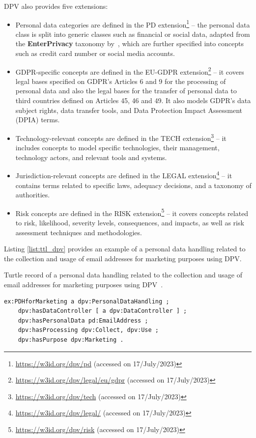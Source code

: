 DPV also provides five extensions:
\begin{itemize}
    \item Personal data categories are defined in the PD extension\footnote{\url{https://w3id.org/dpv/pd} (accessed on 17/July/2023)} -- the personal data class is split into generic classes such as financial or social data, adapted from the \textbf{EnterPrivacy} taxonomy by~\cite{cronk_categories_2017}, which are further specified into concepts such as credit card number or social media accounts.
    \item GDPR-specific concepts are defined in the EU-GDPR extension\footnote{\url{https://w3id.org/dpv/legal/eu/gdpr} (accessed on 17/July/2023)} -- it covers legal bases specified on GDPR's Articles 6 and 9 for the processing of personal data and also the legal bases for the transfer of personal data to third countries defined on Articles 45, 46 and 49. It also models GDPR's data subject rights, data transfer tools, and Data Protection Impact Assessment (DPIA) terms.
    \item Technology-relevant concepts are defined in the TECH extension\footnote{\url{https://w3id.org/dpv/tech} (accessed on 17/July/2023)} -- it includes concepts to model specific technologies, their management, technology actors, and relevant tools and systems.
    \item Jurisdiction-relevant concepts are defined in the LEGAL extension\footnote{\url{https://w3id.org/dpv/legal/} (accessed on 17/July/2023)} -- it contains terms related to specific laws, adequacy decisions, and a taxonomy of authorities.
    \item Risk concepts are defined in the RISK extension\footnote{\url{https://w3id.org/dpv/risk} (accessed on 17/July/2023)} -- it covers concepts related to risk, likelihood, severity levels, consequences, and impacts, as well as risk assessment techniques and methodologies.
\end{itemize}

Listing \ref{list:ttl_dpv} provides an example of a personal data handling related to the collection and usage of email addresses for marketing purposes using DPV.

\begin{listing}[ht]
\caption{Turtle record of a personal data handling related to the collection and usage of email addresses for marketing purposes using DPV~\citep{panetto_creating_2019}.}
\label{list:ttl_dpv}
\begin{verbatim}
ex:PDHforMarketing a dpv:PersonalDataHandling ;
    dpv:hasDataController [ a dpv:DataController ] ;
    dpv:hasPersonalData pd:EmailAddress ;
    dpv:hasProcessing dpv:Collect, dpv:Use ;
    dpv:hasPurpose dpv:Marketing .
\end{verbatim}
\end{listing}

